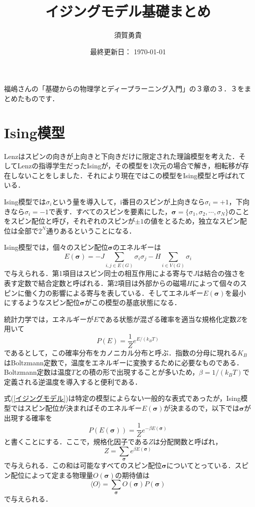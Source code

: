 \documentclass[a4paper,11pt]{jsarticle}
\begin{document}
\title{イジングモデル基礎まとめ}
\author{須賀勇貴}
\date{最終更新日： \today}
\maketitle

福嶋さんの「基礎からの物理学とディープラーニング入門」の３章の３．３をまとめたものです．

\section*{Ising模型}
Lenzはスピンの向きが上向きと下向きだけに限定された理論模型を考えた．そしてLenzの指導学生だったIsingが，その模型を1次元の場合で解き，相転移が存在しないことをしました．それにより現在ではこの模型をIsing模型と呼ばれている．\par
Ising模型では$\sigma_i$という量を導入して，i番目のスピンが上向きなら$\sigma_i = +1$，下向きなら$\sigma_i = -1$で表す．すべてのスピンを要素にした，$\bm{\sigma}=\{ \sigma_1, \sigma_2, \cdots, \sigma_N \}$のことをスピン配位と呼び，それぞれのスピンが$\pm 1$の値をとるため，独立なスピン配位は全部で$2^N$通りあるということになる．\par
Ising模型では，個々のスピン配位$\bm{\sigma}$のエネルギーは
\begin{equation}
  E(\bm{\sigma}) = -J\sum_{i,j \in E(G)}\sigma_i \sigma_j -H \sum_{i \in V(G)} \sigma_i
\end{equation}
で与えられる．第1項目はスピン同士の相互作用による寄与で$J$は結合の強さを表す定数で結合定数と呼ばれる．第2項目は外部からの磁場$H$によって個々のスピンに働く力の影響による寄与を表している．そしてエネルギー$E(\bm{\sigma})$を最小にするようなスピン配位$\bm{\sigma}$がこの模型の基底状態になる．\par
統計力学では，エネルギーが$E$である状態が混ざる確率を適当な規格化定数$Z$を用いて
\begin{equation}
  P(E) = \frac{1}{Z}e^{E/(k_B T)} \label{イジングモデル}
\end{equation}
であるとして，この確率分布をカノニカル分布と呼ぶ．指数の分母に現れる$K_B$はBoltzmann定数で，温度をエネルギーに変換するために必要なものである．Boltzmann定数は温度$T$との積の形で出現することが多いため，$\beta = 1/(k_B T)$で定義される逆温度を導入すると便利である．\par
式(\ref{イジングモデル})は特定の模型によらない一般的な表式であったが，Ising模型ではスピン配位が決まればそのエネルギー$E(\bm{\sigma})$が決まるので，以下では$\bm{\sigma}$が出現する確率を
\begin{equation}
  P(E(\bm{\sigma})) = \frac{1}{Z}e^{-\beta E(\bm{\sigma})}
\end{equation}
と書くことにする．ここで，規格化因子である$Z$は分配関数と呼ばれ，
\begin{equation}
  Z = \sum_{\bm{\sigma}} e^{\beta E(\bm{\sigma})}
\end{equation}
で与えられる．この和は可能なすべてのスピン配位$\bm{\sigma}$についてとっている．スピン配位によって定まる物理量$O(\bm{\sigma})$の期待値は
\begin{equation}
  \langle O \rangle = \sum_{\bm{\sigma}}O(\bm{\sigma}) P(\bm{\sigma}) \label{期待値}
\end{equation}
で与えられる．\par
\end{document}
